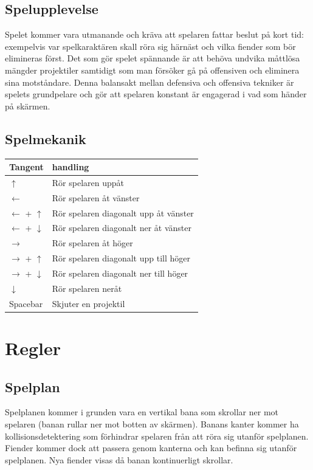 \documentclass{TDP005mall}
\begin{document}
\subsection{Spelupplevelse}

Spelet kommer vara utmanande och kräva att spelaren fattar beslut på kort tid: exempelvis var spelkaraktären skall röra sig härnäst och vilka fiender som bör elimineras först.
Det som gör spelet spännande är att behöva undvika måttlösa mängder projektiler samtidigt som man försöker gå på offensiven och eliminera sina motståndare.
Denna balansakt mellan defensiva och offensiva tekniker är spelets grundpelare och gör att spelaren konstant är engagerad i vad som händer på skärmen.  

\subsection{Spelmekanik}
\begin{table}[h]
\begin{tabularx}{\linewidth}{|l|X|}
\hline
  Tangent & handling \\\hline
  $\uparrow$ & Rör spelaren uppåt \\\hline
  $\leftarrow$ & Rör spelaren åt vänster \\\hline
  $\leftarrow$ + $\uparrow$ & Rör spelaren diagonalt upp åt vänster \\\hline
  $\leftarrow$ + $\downarrow$ & Rör spelaren diagonalt ner åt vänster \\\hline
  $\rightarrow$ & Rör spelaren åt höger \\\hline
  $\rightarrow$ + $\uparrow$ & Rör spelaren diagonalt upp till höger \\\hline
  $\rightarrow$ + $\downarrow$ & Rör spelaren diagonalt ner till höger \\\hline
  $\downarrow$ & Rör spelaren neråt \\\hline
  Spacebar & Skjuter en projektil \\\hline  
\end{tabularx}
\end{table}
\section{Regler}
\subsection{Spelplan}

Spelplanen kommer i grunden vara en vertikal bana som skrollar ner mot spelaren (banan rullar ner mot botten av skärmen).
Banans kanter kommer ha kollisionsdetektering som förhindrar spelaren från att röra sig utanför spelplanen.
Fiender kommer dock att passera genom kanterna och kan befinna sig utanför spelplanen. Nya fiender visas då banan kontinuerligt skrollar.
\end{document}
